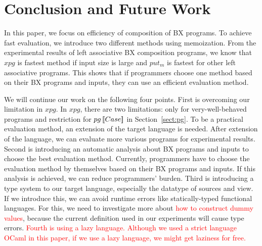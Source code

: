 \section{Conclusion and Future Work} \label{sect:conclusion}

In this paper, we focus on efficiency of composition of BX programs.
To achieve fast evaluation, we introduce two different methods using memoization.
From the experimental results of left associative BX composition programs, we know that $xpg$ is fastest method if input size is large and
$put_m$ is fastest for other left associative programs.
This shows that if programmers choose one method based on their BX programs and inputs, they can use an efficient evaluation method. 


We will continue our work on the following four points.
First is overcoming our limitation in $xpg$. In $xpg$, there are two limitations: only for very-well-behaved programs and restriction for $pg \, [\![Case]\!]$ in Section~\ref{sect:pg}. To be a practical evaluation method, an extension of the target language is needed. After extension of the language, we can evaluate more various programs for experimental results.
Second is introducing an automatic analysis about BX programs and inputs to choose the best evaluation method.
Currently, programmers have to choose the evaluation method by themselves based on their BX programs and inputs. If this analysis is achieved, we can reduce programmers' burden.
Third is introducing a type system to our target language, especially the datatype of sources and view. If we introduce this, we can avoid runtime errors like statically-typed functional languages. For this, we need to investigate more about \textcolor{red}{how to construct dummy values}, because the current definition used in our experiments %
will cause type errors.
\textcolor{red}{Fourth is using a lazy language. Although we used a strict language OCaml in this paper, if we use a lazy language, we might get laziness for free.}






